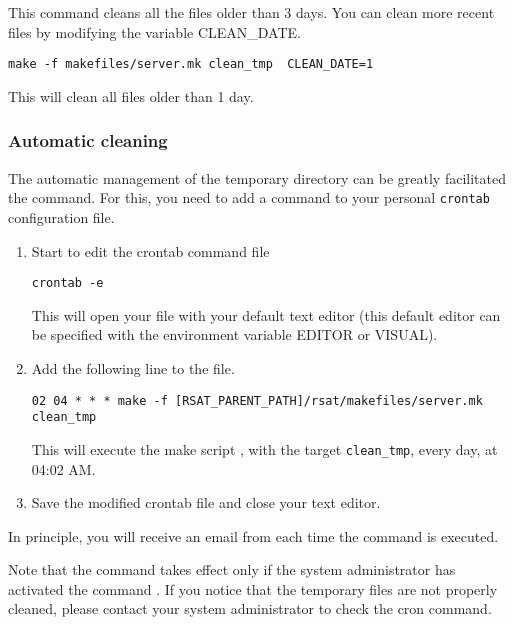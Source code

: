 \documentclass[12pt,a4paper, twoside]{scrreprt} %
\begin{document}
This command cleans all the files older than 3 days. You can clean
more recent files by modifying the variable CLEAN\_DATE.

\begin{lstlisting}
make -f makefiles/server.mk clean_tmp  CLEAN_DATE=1
\end{lstlisting}

This will clean all files older than 1 day.

\subsubsection{Automatic cleaning}

The automatic management of the temporary directory can be greatly
facilitated the  command. For this, you need to add a
command to your personal \texttt{crontab} configuration file.

\begin{enumerate}
\item Start to edit the crontab command file

\begin{lstlisting}
crontab -e
\end{lstlisting}

This will open your  file with your default text editor
(this default editor can be specified with the environment variable
EDITOR or VISUAL).

\item Add the following line to the  file. 

\begin{lstlisting}
02 04 * * * make -f [RSAT_PARENT_PATH]/rsat/makefiles/server.mk clean_tmp
\end{lstlisting}

This will execute the make script , with the target
\texttt{clean\_tmp}, every day, at 04:02 AM. 

\item Save the modified crontab file and close your text editor.

\end{enumerate}

In principle, you will receive an email from  each
time the command is executed.

Note that the command  takes effect only if the
system administrator has activated the command . If you
notice that the temporary files are not properly cleaned, please
contact your system administrator to check the cron command.
\end{document}
